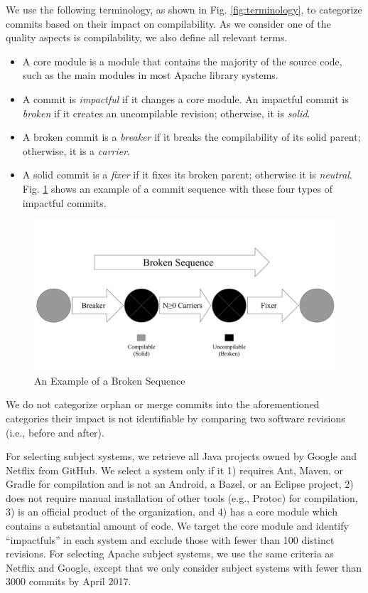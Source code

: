 We use the following terminology, as shown in Fig. \ref{fig:terminology}, to categorize commits based on their impact on compilability. 
As we consider one of the quality aspects is compilability, we also define all relevant terms.

\begin{itemize}
\item A core module is a module that contains the majority of the source code, such as the main modules in most Apache library systems.
\item A commit is \textit{impactful} if it changes a core module.
An impactful commit is \textit{broken} if it creates an uncompilable revision; otherwise, it is \textit{solid}.
\item A broken commit is a \textit{breaker} if it breaks the compilability of its solid parent; otherwise, it is a \textit{carrier}.
\item A solid commit is a \textit{fixer} if it fixes its broken parent; otherwise it is \textit{neutral}.
Fig. \ref{fig:sequence} shows an example of a commit sequence with these four types of impactful commits.
\end{itemize}

\begin{figure}[htbp]
    \centerline{\includegraphics[scale=0.3]{figures/sequence.pdf}}
    \caption{An Example of a Broken Sequence}
    \label{fig:sequence}
    \end{figure}

We do not categorize orphan or merge commits into the aforementioned categories their impact is not identifiable by comparing two software revisions (i.e., before and after).

For selecting subject systems, we retrieve all Java projects owned by Google and Netflix from GitHub.
We select a system only if it 1) requires Ant, Maven, or Gradle for compilation and is not an Android, a Bazel, or an Eclipse project, 2) does not require manual installation of other tools (e.g., Protoc) for compilation, 3) is an official product of the organization, and 4) has a core module which contains a substantial amount of code.
We target the core module and identify ``impactfuls'' in each system and exclude those with fewer than 100 distinct revisions.
For selecting Apache subject systems, we use the same criteria as Netflix and Google, except that we only consider subject systems with fewer than 3000 commits by April 2017.

